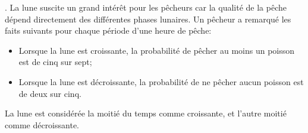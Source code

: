 \begin{questions}

\newpage . \newpage
\question
La lune suscite un grand intérêt pour les pêcheurs car la qualité de la pêche dépend directement des différentes phases lunaires. Un pêcheur a remarqué les faits suivants pour chaque période d'une heure de pêche:

\begin{itemize}
    \item Lorsque la lune est croissante, la probabilité de pêcher au moins un poisson est de cinq sur sept;
    \item Lorsque la lune est décroissante, la probabilité de ne pêcher aucun poisson est de deux sur cinq.
\end{itemize}
La lune est considérée la moitié du temps comme croissante, et l'autre moitié comme décroissante.
\vspace{1cm}

\end{questions}
